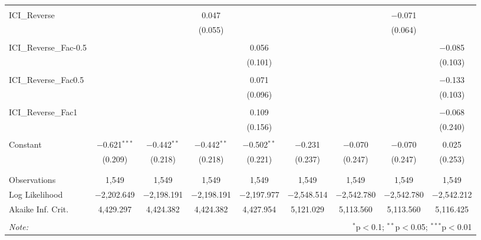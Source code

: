 \begin{table}[!htbp]
\begin{tabular}{@{\extracolsep{5pt}}lcccccccc}
  & & & & & & & & \\ 
 ICI\_Reverse &  &  & 0.047 &  &  &  & $-$0.071 &  \\ 
  &  &  & (0.055) &  &  &  & (0.064) &  \\ 
  & & & & & & & & \\ 
 ICI\_Reverse\_Fac-0.5 &  &  &  & 0.056 &  &  &  & $-$0.085 \\ 
  &  &  &  & (0.101) &  &  &  & (0.103) \\ 
  & & & & & & & & \\ 
 ICI\_Reverse\_Fac0.5 &  &  &  & 0.071 &  &  &  & $-$0.133 \\ 
  &  &  &  & (0.096) &  &  &  & (0.103) \\ 
  & & & & & & & & \\ 
 ICI\_Reverse\_Fac1 &  &  &  & 0.109 &  &  &  & $-$0.068 \\ 
  &  &  &  & (0.156) &  &  &  & (0.240) \\ 
  & & & & & & & & \\ 
 Constant & $-$0.621$^{***}$ & $-$0.442$^{**}$ & $-$0.442$^{**}$ & $-$0.502$^{**}$ & $-$0.231 & $-$0.070 & $-$0.070 & 0.025 \\ 
  & (0.209) & (0.218) & (0.218) & (0.221) & (0.237) & (0.247) & (0.247) & (0.253) \\ 
  & & & & & & & & \\ 
\hline \\[-1.8ex] 
Observations & 1,549 & 1,549 & 1,549 & 1,549 & 1,549 & 1,549 & 1,549 & 1,549 \\ 
Log Likelihood & $-$2,202.649 & $-$2,198.191 & $-$2,198.191 & $-$2,197.977 & $-$2,548.514 & $-$2,542.780 & $-$2,542.780 & $-$2,542.212 \\ 
Akaike Inf. Crit. & 4,429.297 & 4,424.382 & 4,424.382 & 4,427.954 & 5,121.029 & 5,113.560 & 5,113.560 & 5,116.425 \\ 
\hline 
\hline \\[-1.8ex] 
\textit{Note:}  & \multicolumn{8}{r}{$^{*}$p$<$0.1; $^{**}$p$<$0.05; $^{***}$p$<$0.01} \\ 
\end{tabular} 
\end{table} 
